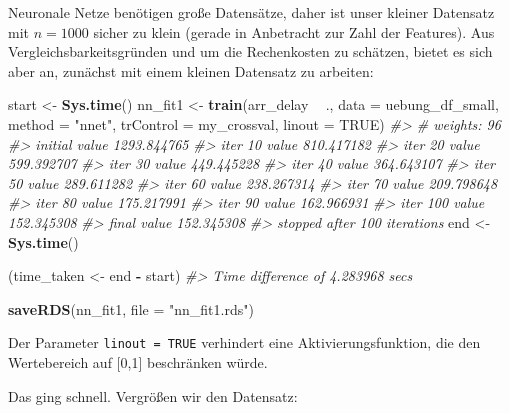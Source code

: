 \documentclass[]{article}
\newenvironment{Shaded}{\begin{snugshade}}{\end{snugshade}}
\newcommand{\CommentTok}[1]{\textcolor[rgb]{0.56,0.35,0.01}{\textit{#1}}}
\newcommand{\DataTypeTok}[1]{\textcolor[rgb]{0.13,0.29,0.53}{#1}}
\newcommand{\KeywordTok}[1]{\textcolor[rgb]{0.13,0.29,0.53}{\textbf{#1}}}
\newcommand{\NormalTok}[1]{#1}
\newcommand{\OperatorTok}[1]{\textcolor[rgb]{0.81,0.36,0.00}{\textbf{#1}}}
\newcommand{\OtherTok}[1]{\textcolor[rgb]{0.56,0.35,0.01}{#1}}
\newcommand{\StringTok}[1]{\textcolor[rgb]{0.31,0.60,0.02}{#1}}
\begin{document}
Neuronale Netze benötigen große Datensätze, daher ist unser kleiner
Datensatz mit \(n=1000\) sicher zu klein (gerade in Anbetracht zur Zahl
der Features). Aus Vergleichsbarkeitsgründen und um die Rechenkosten zu
schätzen, bietet es sich aber an, zunächst mit einem kleinen Datensatz
zu arbeiten:

\begin{Shaded}
\begin{Highlighting}[]
\NormalTok{start <-}\StringTok{ }\KeywordTok{Sys.time}\NormalTok{()}
\NormalTok{nn_fit1 <-}\StringTok{ }\KeywordTok{train}\NormalTok{(arr_delay }\OperatorTok{~}\StringTok{ }\NormalTok{.,}
                 \DataTypeTok{data =}\NormalTok{ uebung_df_small,}
                 \DataTypeTok{method =} \StringTok{"nnet"}\NormalTok{,}
                 \DataTypeTok{trControl =}\NormalTok{ my_crossval,}
                 \DataTypeTok{linout =} \OtherTok{TRUE}\NormalTok{)}
\CommentTok{#> # weights:  96}
\CommentTok{#> initial  value 1293.844765 }
\CommentTok{#> iter  10 value 810.417182}
\CommentTok{#> iter  20 value 599.392707}
\CommentTok{#> iter  30 value 449.445228}
\CommentTok{#> iter  40 value 364.643107}
\CommentTok{#> iter  50 value 289.611282}
\CommentTok{#> iter  60 value 238.267314}
\CommentTok{#> iter  70 value 209.798648}
\CommentTok{#> iter  80 value 175.217991}
\CommentTok{#> iter  90 value 162.966931}
\CommentTok{#> iter 100 value 152.345308}
\CommentTok{#> final  value 152.345308 }
\CommentTok{#> stopped after 100 iterations}
\NormalTok{end <-}\StringTok{ }\KeywordTok{Sys.time}\NormalTok{()}


\NormalTok{(time_taken <-}\StringTok{ }\NormalTok{end }\OperatorTok{-}\StringTok{ }\NormalTok{start)}
\CommentTok{#> Time difference of 4.283968 secs}

\KeywordTok{saveRDS}\NormalTok{(nn_fit1, }\DataTypeTok{file =} \StringTok{"nn_fit1.rds"}\NormalTok{)}
\end{Highlighting}
\end{Shaded}

Der Parameter \texttt{linout\ =\ TRUE} verhindert eine
Aktivierungsfunktion, die den Wertebereich auf {[}0,1{]} beschränken
würde.

Das ging schnell. Vergrößen wir den Datensatz:
\end{document}
